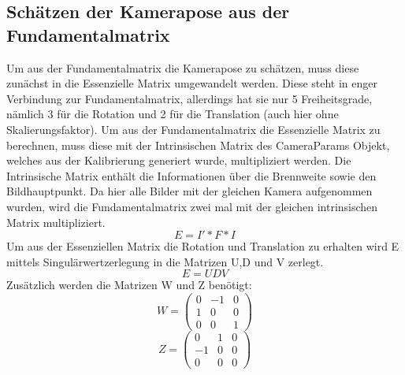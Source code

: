 \subsection{Schätzen der Kamerapose aus der Fundamentalmatrix}
\label{sec:Schätzen der Kamerapose aus der Fundamentalmatrix}
Um aus der Fundamentalmatrix die Kamerapose zu schätzen, muss diese zunächst in die Essenzielle Matrix umgewandelt werden. Diese steht in enger Verbindung zur Fundamentalmatrix, allerdings hat sie nur 5 Freiheitsgrade, nämlich 3 für die Rotation und 2 für die Translation (auch hier ohne Skalierungsfaktor). Um aus der Fundamentalmatrix die Essenzielle Matrix zu berechnen, muss diese mit der Intrinsischen Matrix des CameraParams Objekt, welches aus der Kalibrierung generiert wurde, multipliziert werden. Die Intrinsische Matrix enthält die Informationen über die Brennweite sowie den Bildhauptpunkt. Da hier alle Bilder mit der gleichen Kamera aufgenommen wurden, wird die Fundamentalmatrix zwei mal mit der gleichen intrinsischen Matrix multipliziert.
$$E = I' * F * I$$
Um aus der Essenziellen Matrix die Rotation und Translation zu erhalten wird E mittels Singulärwertzerlegung in die Matrizen U,D und V zerlegt.
$$E = UDV$$
Zusätzlich werden die Matrizen W und Z benötigt:
$$W = \begin{pmatrix} 0 & -1 & 0 \\1 & 0 & 0\\0 & 0 & 1\end{pmatrix}$$
$$Z = \begin{pmatrix} 0 & 1 & 0 \\-1 & 0 & 0\\0 & 0 & 0\end{pmatrix}$$

